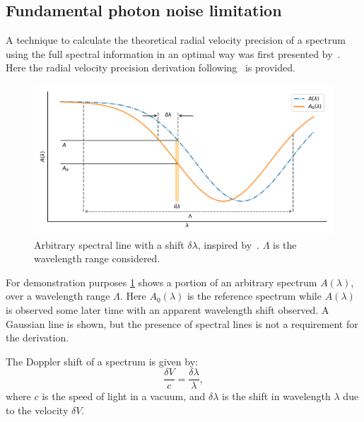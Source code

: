 

\subsection{Fundamental photon noise limitation}
\label{subsec:fundamental_precision}
A technique to calculate the theoretical radial velocity precision of a spectrum using the full spectral information in an optimal way was first presented by~\citet{connes_absolute_1985}.
Here the radial velocity precision derivation following~\citet{connes_absolute_1985, bouchy_fundamental_2001, figueira_radial_2016} is provided.

\begin{figure}
    \centering
    \includegraphics[width=0.8\linewidth]{figures/information-content/precision_plot.pdf}
    \caption[Demonstration of a shifted arbitrary spectral line.]{Arbitrary spectral line with a shift \(\delta \lambda\), inspired by~\citet{connes_absolute_1985}.
        \(\Lambda\) is the wavelength range considered.}
    \label{fig:precisionderivation}
\end{figure}

For demonstration purposes \cref{fig:precisionderivation} shows a portion of an arbitrary spectrum \(A(\lambda)\), over a wavelength range \(\Lambda\).
Here \({A}_{0}(\lambda)\) is the reference spectrum while \(A(\lambda)\) is observed some later time with an apparent wavelength shift observed.
A Gaussian line is shown, but the presence of spectral lines is not a requirement for the derivation.

The Doppler shift of a spectrum is given by:
\begin{equation}
\frac{\delta V}{c} = \frac{\delta \lambda}{\lambda},
\label{eqn:dopplershift}
\end{equation}
where \(c\) is the speed of light in a vacuum, and \(\delta \lambda\) is the shift in wavelength \(\lambda\) due to the velocity \(\delta V\).

